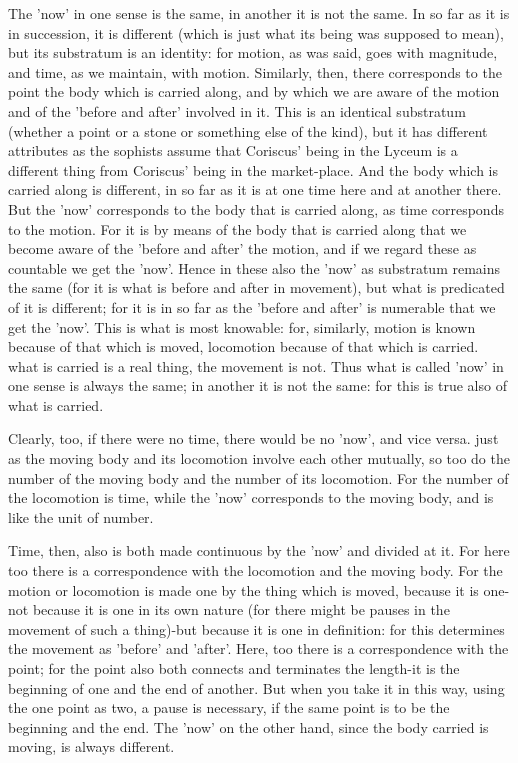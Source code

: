 The 'now' in one sense is the same, in another it is not the same.
In so far as it is in succession, it is different (which is just what
its being was supposed to mean), but its substratum is an identity:
for motion, as was said, goes with magnitude, and time, as we maintain,
with motion. Similarly, then, there corresponds to the point the body
which is carried along, and by which we are aware of the motion and
of the 'before and after' involved in it. This is an identical substratum
(whether a point or a stone or something else of the kind), but it
has different attributes as the sophists assume that Coriscus' being
in the Lyceum is a different thing from Coriscus' being in the market-place.
And the body which is carried along is different, in so far as it
is at one time here and at another there. But the 'now' corresponds
to the body that is carried along, as time corresponds to the motion.
For it is by means of the body that is carried along that we become
aware of the 'before and after' the motion, and if we regard these
as countable we get the 'now'. Hence in these also the 'now' as substratum
remains the same (for it is what is before and after in movement),
but what is predicated of it is different; for it is in so far as
the 'before and after' is numerable that we get the 'now'. This is
what is most knowable: for, similarly, motion is known because of
that which is moved, locomotion because of that which is carried.
what is carried is a real thing, the movement is not. Thus what is
called 'now' in one sense is always the same; in another it is not
the same: for this is true also of what is carried. 

Clearly, too, if there were no time, there would be no 'now', and
vice versa. just as the moving body and its locomotion involve each
other mutually, so too do the number of the moving body and the number
of its locomotion. For the number of the locomotion is time, while
the 'now' corresponds to the moving body, and is like the unit of
number. 

Time, then, also is both made continuous by the 'now' and divided
at it. For here too there is a correspondence with the locomotion
and the moving body. For the motion or locomotion is made one by the
thing which is moved, because it is one-not because it is one in its
own nature (for there might be pauses in the movement of such a thing)-but
because it is one in definition: for this determines the movement
as 'before' and 'after'. Here, too there is a correspondence with
the point; for the point also both connects and terminates the length-it
is the beginning of one and the end of another. But when you take
it in this way, using the one point as two, a pause is necessary,
if the same point is to be the beginning and the end. The 'now' on
the other hand, since the body carried is moving, is always different.

